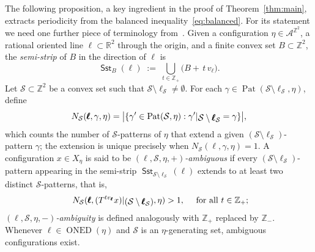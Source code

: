 \documentclass[12pt]{amsart}
\numberwithin{equation}{section}
\DeclareMathOperator{\nexpd}{ONED}
\DeclareMathOperator{\pat}{Pat}
\DeclareMathOperator{\sst}{\mathsf{Sst}}
\newcommand{\bb}[1]{\mathbb{#1}}
\newcommand{\sob}[1]{\ensuremath{{\mathbin |}\raise-.4ex\hbox{$#1$}}}
\begin{document}
The following proposition, a key ingredient in the proof of Theorem~\ref{thm:main}, extracts periodicity from the balanced inequality~\eqref{eq:balanced}. For its statement we need one further piece of terminology from~\cite{CyrKra15}.
Given a configuration \(\eta \in \mathcal{A}^{\bb{Z}^2}\), a rational oriented line $\pmb{\ell} \subset \bb{R}^2$ through the origin, and a finite convex set $B \subset \bb{Z}^2$, the \emph{semi-strip} of $B$ in the direction of $\pmb{\ell}$ is  
\[
\sst_{B}(\pmb{\ell})
  \;:=\;
  \bigcup_{t\in\mathbb{Z}_+}
  \bigl(B+\,t\,v_{\pmb{\ell}}\bigr).
\]
Let $\mathcal{S} \subset \bb{Z}^2$ be a convex set such that $\mathcal{S} \setminus \pmb{\ell}_{\mathcal{S}} \neq \emptyset$. For each $\gamma \in \pat(\mathcal{S} \setminus \pmb{\ell}_{\mathcal{S}},\eta)$, define 
\[
N_{\mathcal{S}}(\pmb{\ell},\gamma,\eta) = \big|\{\gamma' \in \pat(\mathcal{S},\eta) : \gamma'\sob{\mathcal{S} \setminus \pmb{\ell}_{\mathcal{S}}} = \gamma\}\big|,
\] 
which counts the number of $\mathcal S$-patterns of $\eta$ that extend a given $(\mathcal S \setminus \pmb{\ell}_{\mathcal{S}})$-pattern $ \gamma $; the extension is unique precisely when $N_{\mathcal{S}}(\pmb{\ell},\gamma,\eta) = 1$. A configuration $x \in X_\eta$ is said to be \emph{$(\pmb{\ell},\mathcal{S},\eta,+)$-ambiguous} if every $(\mathcal S \setminus \pmb{\ell}_{\mathcal{S}})$-pattern appearing in the semi-strip $ \sst_{\mathcal S \setminus \pmb{\ell}_{\mathcal S}}(\pmb{\ell}) $ extends to at least two distinct $\mathcal S$-patterns, that is,
\begin{equation}\label{ambiguous+}
	 \ N_{\mathcal S}(\pmb{\ell},(T^{t v_{\pmb{\ell}}} x)\sob{(\mathcal S \setminus \pmb{\ell}_{\mathcal S})}, \eta) > 1, \quad \text{ for all } t \in \mathbb Z_+;
\end{equation}
\emph{$(\pmb{\ell},\mathcal{S},\eta,-)$-ambiguity} is defined analogously with $ \mathbb Z_+ $ replaced by $ \mathbb Z_- $. Whenever $ \pmb{\ell} \in \nexpd(\eta)$ and $\mathcal{S} $ is an $\eta$-gene\-ra\-ting set, ambiguous configurations exist.
\end{document}
